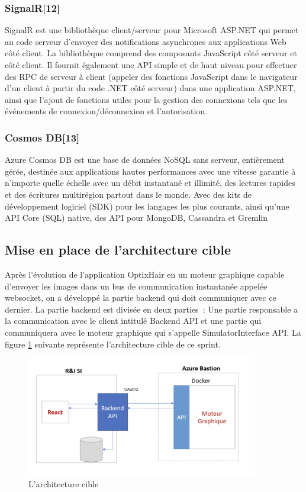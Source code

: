 \newpage
\subsubsection*{SignalR[12]}
SignalR est une bibliothèque client/serveur pour Microsoft ASP.NET qui permet au code serveur d'envoyer des notifications asynchrones aux applications Web côté client. La bibliothèque comprend des composants JavaScript côté serveur et côté client. Il fournit également une API simple et de haut niveau pour effectuer des RPC de serveur à client (appeler des fonctions JavaScript dans le navigateur d'un client à partir du code .NET côté serveur) dans une application ASP.NET, ainsi que l'ajout de fonctions utiles pour la gestion des connexions tels que les événements de connexion/déconnexion et l’autorisation.



\subsubsection*{Cosmos DB[13]}
Azure Cosmos DB est une base de données NoSQL sans serveur, entièrement gérée, destinée aux applications hautes performances avec une vitesse garantie à n’importe quelle échelle avec un débit instantané et illimité, des lectures rapides et des écritures multirégion partout dans le monde. Avec des kits de développement logiciel (SDK) pour les langages les plus courants, ainsi qu'une API Core (SQL) native, des API pour MongoDB, Cassandra et Gremlin



\newpage
\subsection{Mise en place de l’architecture cible}
Après l’évolution de l’application OptixHair en un moteur graphique capable d’envoyer les images dans un bus de communication instantanée appelée websocket, on a développé la partie backend qui doit communiquer avec ce dernier.
La partie backend est divisée en deux parties : 
Une partie responsable a la communication avec le client intitulé Backend API et une partie qui communiquera avec le moteur graphique qui s’appelle SimulatorInterface API.
La figure \ref{fig:cible} suivante représente l’architecture cible de ce sprint.

\begin{figure}[!ht]\centering
\includegraphics[width=0.9\textwidth]{chapitres/chapitre4/figures/ArchCible.png}
\caption{L’architecture cible}
\label{fig:cible}
\end{figure}

